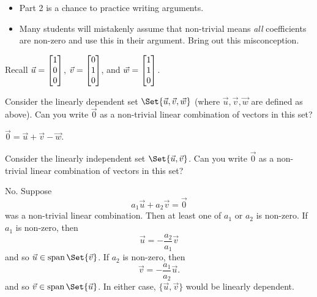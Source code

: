 \documentclass{problemset}
\begin{document}
	\question
	\begin{annotation}
		\begin{goals}
		\end{goals}

		\begin{notes}
			\begin{itemize}
				\item Part 2 is a chance to practice writing arguments.
				\item Many students will mistakenly assume that non-trivial means
					\emph{all} coefficients are non-zero and use this in
					their argument. Bring out this misconception.
			\end{itemize}
		\end{notes}
	\end{annotation}
		Recall $\vec u=\mat{1\\0\\0}$, $\vec v=\mat{0\\1\\0}$, and $\vec w=\mat{1\\1\\0}$.
	\begin{parts}
		\item Consider the linearly dependent
			set $\Set{\vec u,\vec v,\vec w}$ (where $\vec u,\vec v,\vec w$ are
			defined as above). Can you write $\vec 0$ as a non-trivial linear
			combination of vectors in this set?
			\begin{solution}[inline]
				$\vec 0 = \vec u + \vec v - \vec w$.
			\end{solution}
		\item Consider the linearly independent set $\Set{\vec u,\vec v}$.
			Can you write $\vec 0$ as a non-trivial linear combination of
			vectors in this set?
			\begin{solution}
				No. Suppose
				\[
					a_1 \vec u + a_2 \vec v = \vec 0
				\]
				was a non-trivial linear combination. Then at least one of $a_1$ or $a_2$
				is non-zero. If $a_1$ is non-zero, then
				\[
					\vec u = -\frac{a_2}{a_1}\vec v
				\]
				and so $\vec u\in\Span\Set{\vec v}$.
				If $a_2$ is non-zero, then
				\[
					\vec v=-\frac{a_1}{a_2}\vec u.
				\]
				and so $\vec v\in\Span\Set{\vec u}$.
				In either case, $\{\vec u,\vec v\}$ would be linearly dependent.
			\end{solution}
	\end{parts}
\end{document}
